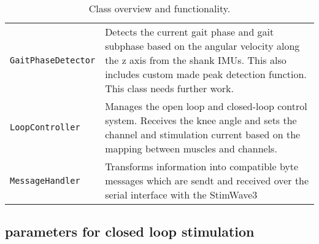 \begin{table}[H]
\begin{tcolorbox}
\begin{tabular}{p{} | p{}}
\texttt{GaitPhaseDetector} & Detects the current gait phase and gait subphase based on the angular velocity along the z axis from the shank IMUs. This also includes custom made peak detection function. This class needs further work. \\

\texttt{LoopController} & Manages the open loop and closed-loop control system. Receives the knee angle and sets the channel and stimulation current based on the mapping between muscles and channels. \\

\texttt{MessageHandler} & Transforms information into compatible byte messages which are sendt and received over the serial interface with the StimWave3 \\
\end{tabular}
\end{tcolorbox}
\caption{Class overview and functionality.}
\label{tab:class-overview}
\end{table}




\subsection{parameters for closed loop stimulation}


